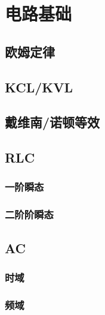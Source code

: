 \chapter{电路基础}

\section{欧姆定律}

\section{KCL/KVL}

\section{戴维南/诺顿等效}

\section{RLC}

\subsection{一阶瞬态}

\subsection{二阶阶瞬态}

\section{AC}

\subsection{时域}

\subsection{频域}
